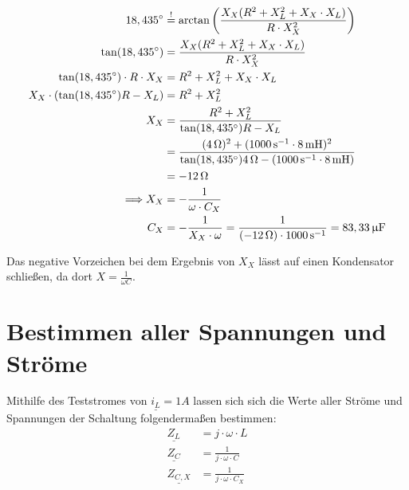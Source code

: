 \documentclass[11pt]{scrartcl}
\begin{document}
\begin{align*}
  18,435^{\circ} &\overset{!}{=} \arctan\left(\frac{X_{X} (R^{2} + X_{L}^{2} + X_{X} \cdot X_{L})}{R \cdot X_{X}^{2}}\right) \\
  \tan(18,435^{\circ}) &= \frac{X_{X} (R^{2} + X_{L}^{2} + X_{X} \cdot X_{L})}{R \cdot X_{X}^{2}} \\
  \tan(18,435^{\circ}) \cdot R \cdot X_{X} &= R^{2} + X_{L}^{2} + X_{X} \cdot X_{L} \\
  X_{X} \cdot (\tan(18,435^{\circ})  R - X_{L}) &= R^{2} + X_{L}^{2} \\
  X_{X} &= \frac{R^{2} + X_{L}^{2}}{\tan(18,435^{\circ})  R - X_{L}} \\
                       &= \frac{(4 \,\text{$\Omega$})^{2} + (1000 \,\text{s}^{-1} \cdot 8 \,\text{mH})^{2}}{\tan(18,435^{\circ})  4 \,\text{$\Omega$} - (1000 \,\text{s}^{-1} \cdot 8 \,\text{mH})} \\
                       &= -12 \,\text{$\Omega$} \\
  \Longrightarrow X_{X} &= -\frac{1}{\omega \cdot C_{X}} \\
  C_{X} &= -\frac{1}{X_{X} \cdot \omega} = \frac{1}{(-12 \,\text{$\Omega$}) \cdot 1000 \,\text{s}^{-1}} = 83,33 \,\text{$\upmu$F}
\end{align*}

Das negative Vorzeichen bei dem Ergebnis von $X_{X}$ lässt auf einen Kondensator schließen, da dort $X = \frac{1}{\omega C}$.

\section{Bestimmen aller Spannungen und Ströme}
Mithilfe des Teststromes von $\underline{i_{L}} = 1 \unit{A}$ lassen sich sich die Werte aller Ströme und Spannungen der Schaltung folgendermaßen bestimmen:
\begin{align*}
  \underline{Z_{L}} &= j \cdot \omega \cdot L \\
  \underline{Z_{C}} &= \frac{1}{j \cdot \omega \cdot C} \\
  \underline{Z_{C,X}} &= \frac{1}{j \cdot \omega \cdot C_{X}}
\end{align*}
\end{document}
